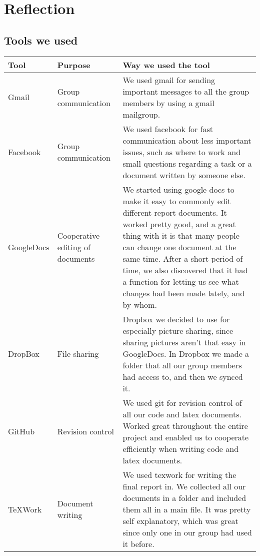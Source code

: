 
\chapter{Reflection}
\section{Tools we used}

\begin{tabularx}{\linewidth}{>{\setlength\hsize{.5\hsize}}X|>{\setlength\hsize{0.3\hsize}}X|>{\setlength\hsize{1\hsize}}X}
\textbf{Tool} & \textbf{Purpose} & \textbf{Way we used the tool} \\ \hline \hline

Gmail & Group communication &We used gmail for sending important messages to all the group members by using a gmail mailgroup.\\ \hline

Facebook & Group communication &We used facebook for fast communication about less important issues, such as where to work and small questions regarding a task or a document written by someone else.\\ \hline

GoogleDocs &Cooperative editing of documents &We started using google docs to make it easy to commonly edit different report documents. It worked pretty good, and a great thing with it is that many people can change one document at the same time. After a short period of time, we also discovered that it had a function for letting us see what changes had been made lately, and by whom.\\ \hline

DropBox & File sharing &Dropbox we decided to use for especially picture sharing, since sharing pictures aren’t that easy in GoogleDocs. In Dropbox we made a folder that all our group members had access to, and then we synced it.\\ \hline

GitHub &  Revision control&We used git for revision control of all our code and latex documents. Worked great throughout the entire project and enabled us to cooperate efficiently when writing code and latex documents.\\ \hline

TeXWork & Document writing &We used texwork for writing the final report in. We collected all our documents in a folder and included them all in a main file. It was pretty self explanatory, which was great since only one in our group had used it before.\\ \hline


\end{tabularx}
